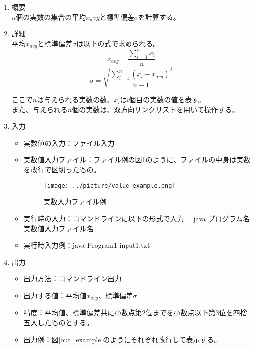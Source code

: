 \documentclass[titlepage,a4paper,12pt]{ltjsreport}
\begin{document}

\begin{enumerate}
    \item 概要 \mbox{}\\
    $n$個の実数の集合の平均$x_avg$と標準偏差$\sigma$を計算する。\\


    \item 詳細\mbox{}\\
    平均$x_{avg}$と標準偏差$\sigma$は以下の式で求められる。
    \[x_{avg} = \frac{\sum^{n}_{i=1}x_i}{n}\]
    \[\sigma = \sqrt{\frac{\sum^{n}_{i=1}(x_i - x_{avg})^2}{n-1}}\]
    
    ここで$n$は与えられる実数の数、$x_i$は$i$個目の実数の値を表す。\\
    また、与えられる$n$個の実数は、双方向リンクリストを用いて操作する。


    \item 入力\mbox{}\\
    
    \begin{itemize}
        \item 実数値の入力：ファイル入力
        \item 実数値入力ファイル：ファイル例の図\ref{value_example}のように、ファイルの中身は実数を改行で区切ったもの。
        
        \begin{figure}[h]
            \centering
            \texttt{[image: ../picture/value\_example.png]}
            \caption{実数入力ファイル例}
            \label{value_example}
        \end{figure}
        
        \item 実行時の入力：コマンドラインに以下の形式で入力
        　java プログラム名 実数値入力ファイル名
        \item 実行時入力例：java Program1 input1.txt

    \end{itemize}


    \item 出力\mbox{}\\
    \begin{itemize}
        \item 出力方法：コマンドライン出力
        \item 出力する値：平均値$x_{avg}$、標準偏差$\sigma$
        \item 精度：平均値、標準偏差共に小数点第2位までを小数点以下第3位を四捨五入したものとする。
        \item 出力例：図\ref{out_example}のようにそれぞれ改行して表示する。
        

\end{itemize}
\end{enumerate}
\end{document}
